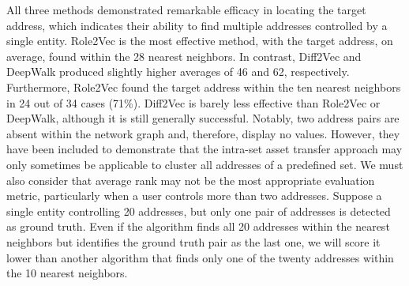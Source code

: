 \documentclass[12pt,a4paper,titlepage,oneside,english]{article}
\begin{document}
All three methods demonstrated remarkable efficacy in locating the target address, which indicates their ability to find multiple addresses controlled by a single entity.
Role2Vec is the most effective method, with the target address, on average, found within the 28 nearest neighbors. In contrast, Diff2Vec and DeepWalk produced slightly higher averages of 46 and 62, respectively. Furthermore, Role2Vec found the target address within the ten nearest neighbors in 24 out of 34 cases (71\%). Diff2Vec is barely less effective than Role2Vec or DeepWalk, although it is still generally successful. \newline
Notably, two address pairs are absent within the network graph and, therefore, display no values. However, they have been included to demonstrate that the intra-set asset transfer approach may only sometimes be applicable to cluster all addresses of a predefined set. \newline
We must also consider that average rank may not be the most appropriate evaluation metric, particularly when a user controls more than two addresses. Suppose a single entity controlling 20 addresses, but only one pair of addresses is detected as ground truth. Even if the algorithm finds all 20 addresses within the nearest neighbors but identifies the ground truth pair as the last one, we will score it lower than another algorithm that finds only one of the twenty addresses within the 10 nearest neighbors.
\end{document}
